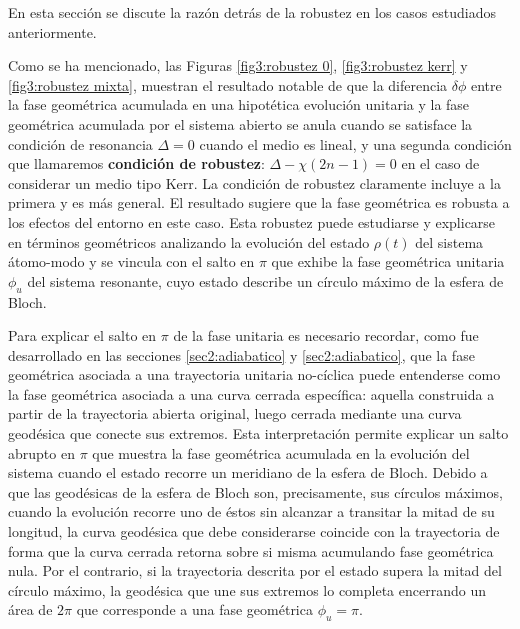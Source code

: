 En esta sección se discute la razón detrás de la robustez en los casos estudiados anteriormente. 

Como se ha mencionado, las Figuras \ref{fig3:robustez 0}, \ref{fig3:robustez kerr} y \ref{fig3:robustez mixta}, muestran el resultado notable de que la diferencia $\delta\phi$ entre la fase geométrica acumulada en una hipotética evolución unitaria y la fase geométrica acumulada por el sistema abierto se anula cuando se satisface la condición de resonancia $\Delta = 0$ cuando el medio es lineal, y una segunda condición que llamaremos \textbf{condición de robustez}: $\Delta-\chi(2n-1)=0$ en el caso de considerar un medio tipo Kerr. La condición de robustez claramente incluye a la primera y es más general. El resultado sugiere que la fase geométrica es robusta a los efectos del entorno en este caso. Esta robustez puede estudiarse y explicarse en términos geométricos analizando la evolución del estado $\rho(t)$ del sistema átomo-modo y se vincula con el salto en $\pi$ que exhibe la fase geométrica unitaria $\phi_u$ del sistema resonante, cuyo estado describe un círculo máximo de la esfera de Bloch.

Para explicar el salto en $\pi$ de la fase unitaria es necesario recordar, como fue desarrollado en las secciones \ref{sec2:adiabatico} y \ref{sec2:adiabatico}, que la fase geométrica asociada a una trayectoria unitaria no-cíclica puede entenderse como la fase geométrica asociada a una curva cerrada específica: aquella construida a partir de la trayectoria abierta original, luego cerrada mediante una curva geodésica que conecte sus extremos. Esta interpretación permite explicar un salto abrupto en $\pi$ que muestra la fase geométrica acumulada en la evolución del sistema cuando el estado recorre un meridiano de la esfera de Bloch. Debido a que las geodésicas de la esfera de Bloch son, precisamente, sus círculos máximos, cuando la evolución recorre uno de éstos sin alcanzar a transitar la mitad de su longitud, la curva geodésica que debe considerarse coincide con la trayectoria de forma que la curva cerrada retorna sobre si misma acumulando fase geométrica nula. Por el contrario, si la trayectoria descrita por el estado supera la mitad del círculo máximo, la geodésica que une sus extremos lo completa encerrando un área de $2\pi$ que corresponde a una fase geométrica $\phi_u=\pi$.

